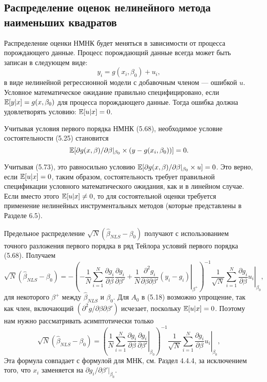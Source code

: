 \subsection{Распределение оценок нелинейного метода наименьших квадратов}

Распределение оценки НМНК будет меняться в зависимости от процесса порождающего данные. Процесс порождающий данные всегда может быть записан в следующем виде:
\begin{equation}
y_i=g(x_i,\beta_0)+u_i,
\end{equation}
в виде нелинейной регрессионной модели с добавочным членом --- ошибкой $u$. Условное математическое ожидание правильно специфицировано, если $\mathbb{E}[y|x]=g(x,\beta_0)$ для процесса порождающего данные. Тогда ошибка должна удовлетворять условию: $\mathbb{E}[u|x]=0$.

Учитывая условия первого порядка НМНК (5.68), необходимое условие состоятельности (5.25) становится
\[
\mathbb{E}[\partial g(x,\beta) / \partial \beta|_{\beta_0} \times (y-g(x_i,\beta_0))]=0.
\]

Учитывая (5.73), это равносильно условию $\mathbb{E}[\partial g(x,\beta) / \partial \beta|_{\beta_0} \times u]=0$. Это верно, если $\mathbb{E}[u|x]=0$, таким образом, состоятельность требует правильной спецификации условного математического ожидания, как и в линейном случае. Если вместо этого $\mathbb{E}[u|x] \not = 0$, то для состоятельной оценки требуется применение нелинейных инструментальных методов (которые представлены в Разделе 6.5).

Предельное распределение $\sqrt{N}(\hat{\beta}_{NLS}-\beta_0)$ получают с использованием точного разложения первого порядка в ряд Тейлора условий первого порядка (5.68). Получаем
\[
\sqrt{N}(\hat{\beta}_{NLS}-\beta_0)=-\left( -\frac{1}{N}  \sum_{i=1}^{N} \frac{\partial g_i}{\partial \beta} \frac{\partial g_i}{\partial \beta'} + \left. \frac{1}{N} \frac{\partial^2 g_i}{\partial \beta \partial \beta'} (y_i-g_i) \right|_{\beta^+} \right) ^{-1} \left. \frac{1}{\sqrt{N}} \sum_{i=1}^{N} \frac{\partial g_i}{\partial \beta} u_i \right|_{\beta_0},
\]
для некоторого $\beta^+$  между $\hat{\beta}_{NLS}$ и $\beta_0$. Для $A_0$ в (5.18) возможно упрощение, так как член, включающий $(\partial^2 g/ \partial \beta \partial \beta')$ исчезает, поскольку $\mathbb{E}[u|x]=0$. Поэтому нам нужно рассматривать асимптотически только
\[
\sqrt{N}(\hat{\beta}_{NLS}-\beta_0)= \left( \left.\frac{1}{N} \sum_{i=1}^{N} \frac{\partial g_i}{\partial \beta} \frac{\partial g_i}{\partial \beta'} \right|_{\beta_0}  \right) ^{-1} \left. \frac{1}{\sqrt{N}} \sum_{i=1}^{N} \frac{\partial g_i}{\partial \beta} u_i \right|_{\beta_0},
\]
Эта формула совпадает с формулой для МНК, см. Раздел 4.4.4, за исключением того, что $x_i$ заменяется на $\partial g_i / \partial \beta'|_{\beta_0}$.

